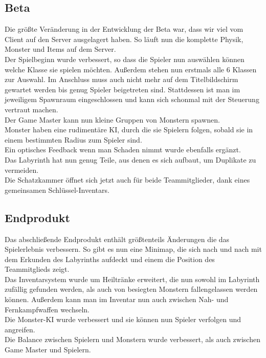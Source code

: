 \documentclass[10pt,a4paper,notitlepage]{scrreprt}
\begin{document}
			\subsection{Beta}
			
			Die größte Veränderung in der Entwicklung der Beta war, dass wir viel vom Client auf den Server ausgelagert haben. So läuft nun die komplette Physik, Monster und Items auf dem Server.\\
			Der Spielbeginn wurde verbessert, so dass die Spieler nun auswählen können welche Klasse sie spielen möchten. Außerdem stehen nun erstmals alle 6 Klassen zur Auswahl. Im Anschluss muss auch nicht mehr auf dem Titelbildschirm gewartet werden bis genug Spieler beigetreten sind. Stattdessen ist man im jeweiligem Spawnraum eingeschlossen und kann sich schonmal mit der Steuerung vertraut machen.\\
			Der Game Master kann nun kleine Gruppen von Monstern spawnen.\\
			Monster haben eine rudimentäre KI, durch die sie Spielern folgen, sobald sie in einem bestimmten Radius zum Spieler sind.\\
			Ein optisches Feedback wenn man Schaden nimmt wurde ebenfalls ergänzt.\\
			Das Labyrinth hat nun genug Teile, aus denen es sich aufbaut, um Duplikate zu vermeiden.\\
			Die Schatzkammer öffnet sich jetzt auch für beide Teammitglieder, dank eines gemeinsamen Schlüssel-Inventars.\\
			
			\subsection{Endprodukt}
			
			Das abschließende Endprodukt enthält größtenteils Änderungen die das Spielerlebnis verbessern. So gibt es nun eine Minimap, die sich nach und nach mit dem Erkunden des Labyrinths aufdeckt und einem die Position des Teammitglieds zeigt.\\
			Das Inventarsystem wurde um Heiltränke erweitert, die nun sowohl im Labyrinth zufällig gefunden werden, als auch von besiegten Monstern fallengelassen werden können. Außerdem kann man im Inventar nun auch zwischen Nah- und Fernkampfwaffen wechseln.\\
			Die Monster-KI wurde verbessert und sie können nun Spieler verfolgen und angreifen.\\
			Die Balance zwischen Spielern und Monstern wurde verbessert, als auch zwischen Game Master und Spielern.\\
\end{document}
